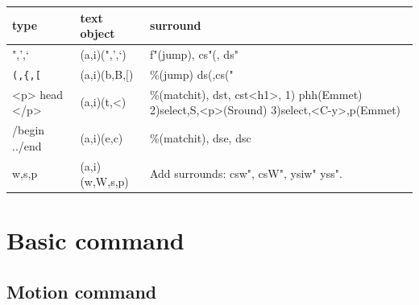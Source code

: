 \documentclass[a4paper,12pt,twoside]{book}
\begin{document}
\begin{tabular}{p{}|p{}|p{}}
\hline 
type & text object & surround \\

\hline 
",',`  & (a,i)(",',`) & f"(jump), cs"(, ds" \\

\hline 
\verb=(,{,[= & (a,i)(b,B,$[$) & \%(jump) ds(,cs("  \\

\hline 
<p> head </p> & (a,i)(t,<) & \%(matchit), dst, cst<h1>, 1) phh(Emmet) 2)select,S,<p>(Sround) 3)select,<C-y>,p(Emmet) \\

\hline
/begin ../end & (a,i)(e,c) & \%(matchit), dse, dsc \\

\hline 
w,s,p & (a,i)(w,W,s,p) & Add surrounds: csw", csW", ysiw" yss".  \\

\hline 
\end{tabular}

\section{Basic command}
\subsection{Motion command}
\end{document}
